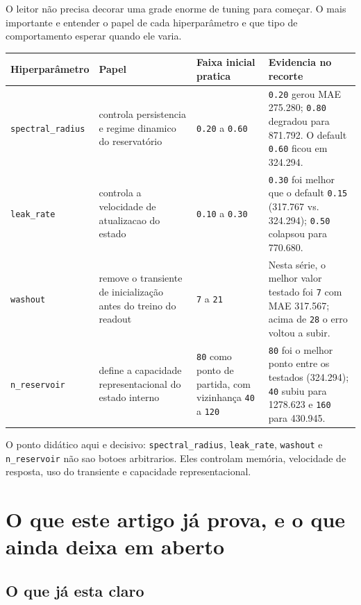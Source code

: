 \documentclass[12pt]{article}
\begin{document}
O leitor não precisa decorar uma grade enorme de tuning para começar. O mais importante e entender o papel de cada hiperparâmetro e que tipo de comportamento esperar quando ele varia.

\begin{longtable}[]{@{}llll@{}}
\toprule\noalign{}
Hiperparâmetro & Papel & Faixa inicial pratica & Evidencia no recorte \\
\midrule\noalign{}
\endhead
\bottomrule\noalign{}
\endlastfoot
\texttt{spectral\_radius} & controla persistencia e regime dinamico do reservatório & \texttt{0.20} a \texttt{0.60} & \texttt{0.20} gerou MAE 275.280; \texttt{0.80} degradou para 871.792. O default \texttt{0.60} ficou em 324.294. \\
\texttt{leak\_rate} & controla a velocidade de atualizacao do estado & \texttt{0.10} a \texttt{0.30} & \texttt{0.30} foi melhor que o default \texttt{0.15} (317.767 vs. 324.294); \texttt{0.50} colapsou para 770.680. \\
\texttt{washout} & remove o transiente de inicialização antes do treino do readout & \texttt{7} a \texttt{21} & Nesta série, o melhor valor testado foi \texttt{7} com MAE 317.567; acima de \texttt{28} o erro voltou a subir. \\
\texttt{n\_reservoir} & define a capacidade representacional do estado interno & \texttt{80} como ponto de partida, com vizinhança \texttt{40} a \texttt{120} & \texttt{80} foi o melhor ponto entre os testados (324.294); \texttt{40} subiu para 1278.623 e \texttt{160} para 430.945. \\
\end{longtable}

O ponto didático aqui e decisivo: \texttt{spectral\_radius}, \texttt{leak\_rate}, \texttt{washout} e \texttt{n\_reservoir} não sao botoes arbitrarios. Eles controlam memória, velocidade de resposta, uso do transiente e capacidade representacional.

\section{O que este artigo já prova, e o que ainda deixa em aberto}\label{14-o-que-este-artigo-juxe1-prova-e-o-que-ainda-deixa-em-aberto}

\subsection{O que já esta claro}\label{141-o-que-juxe1-esta-claro}
\end{document}
